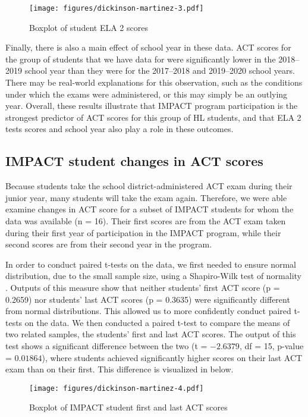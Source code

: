 \documentclass[output=paper]{langscibook}
\begin{document}
\begin{figure}
\caption{\label{fig:5:3}Boxplot of student ELA 2 scores}
\texttt{[image: figures/dickinson-martinez-3.pdf]}
\end{figure}

Finally, there is also a main effect of school year in these data. ACT scores for the group of students that we have data for were significantly lower in the 2018--2019 school year than they were for the 2017--2018 and 2019--2020 school years. There may be real-world explanations for this observation, such as the conditions under which the exams were administered, or this may simply be an outlying year.  Overall, these results illustrate that IMPACT program participation is the strongest predictor of ACT scores for this group of HL students, and that ELA 2 tests scores and school year also play a role in these outcomes.

\subsection{IMPACT student changes in ACT scores}

Because students take the school district-administered ACT exam during their junior year, many students will take the exam again. Therefore, we were able examine changes in ACT score for a subset of IMPACT students for whom the data was available (n = 16). Their first scores are from the ACT exam taken during their first year of participation in the IMPACT program, while their second scores are from their second year in the program.

In order to conduct paired t-tests on the data, we first needed to ensure normal distribution, due to the small sample size, using a Shapiro-Wilk test of normality \citep{ShapiroWilk1965}. Outputs of this measure show that neither students' first ACT score (p = 0.2659) nor students’ last ACT scores (p = 0.3635) were significantly different from normal distributions. This allowed us to more confidently conduct paired t-tests on the data. We then conducted a paired t-test to compare the means of two related samples, the students’ first and last ACT scores. The output of this test shows a significant difference between the two (t = $-2.6379$, df = 15, p-value = $0.01864$), where students achieved significantly higher scores on their last ACT exam than on their first. This difference is visualized in  below.

\begin{figure}
\caption{\label{fig:5:4}Boxplot of IMPACT student first and last ACT scores}
\texttt{[image: figures/dickinson-martinez-4.pdf]}
\end{figure}
\end{document}
